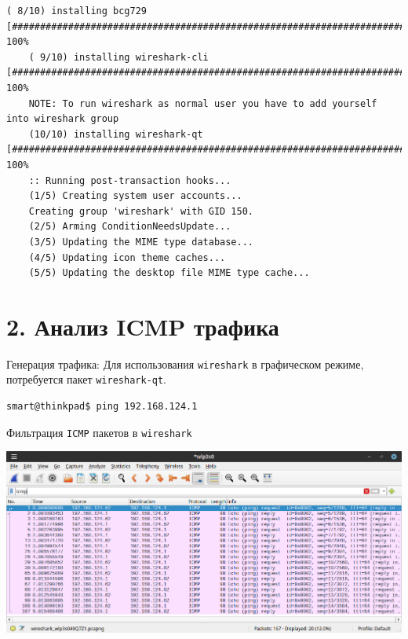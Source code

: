 \begin{Verbatim}[frame=single]
    ( 8/10) installing bcg729                                                                                                                      [########################################################################################] 100%
    ( 9/10) installing wireshark-cli                                                                                                               [########################################################################################] 100%
    NOTE: To run wireshark as normal user you have to add yourself into wireshark group
    (10/10) installing wireshark-qt                                                                                                                [########################################################################################] 100%
    :: Running post-transaction hooks...
    (1/5) Creating system user accounts...
    Creating group 'wireshark' with GID 150.
    (2/5) Arming ConditionNeedsUpdate...
    (3/5) Updating the MIME type database...
    (4/5) Updating icon theme caches...
    (5/5) Updating the desktop file MIME type cache...
\end{Verbatim}

\section*{2. Анализ ICMP трафика}

Генерация трафика:
Для использования \texttt{wireshark} в графическом режиме, потребуется пакет \texttt{wireshark-qt}.
\begin{Verbatim}[frame=single]
    smart@thinkpad$ ping 192.168.124.1
\end{Verbatim}

Фильтрация \texttt{ICMP} пакетов в \texttt{wireshark}
\begin{center}
    \includegraphics[scale=0.6]{res/5.wireshark-icmp.png}
\end{center}

